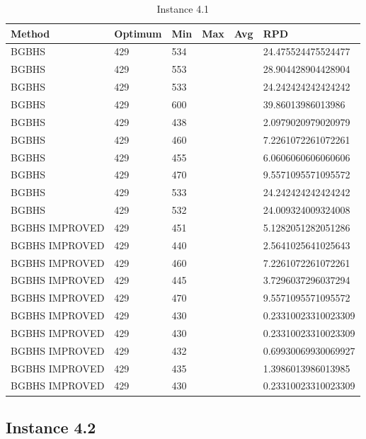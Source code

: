 \begin{table}[H]
\centering
\begin{tabular}{ | l | l | l | l | l | l | }
\hline
	Method & Optimum & Min & Max & Avg & RPD \\ \hline
	BGBHS & 429 & 534 &  &  & 24.475524475524477 \\ \hline
	BGBHS & 429 & 553 &  &  & 28.904428904428904 \\ \hline
	BGBHS & 429 & 533 &  &  & 24.242424242424242 \\ \hline
	BGBHS & 429 & 600 &  &  & 39.86013986013986 \\ \hline
	BGBHS & 429 & 438 &  &  & 2.0979020979020979 \\ \hline
	BGBHS & 429 & 460 &  &  & 7.2261072261072261 \\ \hline
	BGBHS & 429 & 455 &  &  & 6.0606060606060606 \\ \hline
	BGBHS & 429 & 470 &  &  & 9.5571095571095572 \\ \hline
	BGBHS & 429 & 533 &  &  & 24.242424242424242 \\ \hline
	BGBHS & 429 & 532 &  &  & 24.009324009324008 \\ \hline
	BGBHS IMPROVED & 429 & 451 &  &  & 5.1282051282051286 \\ \hline
	BGBHS IMPROVED & 429 & 440 &  &  & 2.5641025641025643 \\ \hline
	BGBHS IMPROVED & 429 & 460 &  &  & 7.2261072261072261 \\ \hline
	BGBHS IMPROVED & 429 & 445 &  &  & 3.7296037296037294 \\ \hline
	BGBHS IMPROVED & 429 & 470 &  &  & 9.5571095571095572 \\ \hline
	BGBHS IMPROVED & 429 & 430 &  &  & 0.23310023310023309 \\ \hline
	BGBHS IMPROVED & 429 & 430 &  &  & 0.23310023310023309 \\ \hline
	BGBHS IMPROVED & 429 & 432 &  &  & 0.69930069930069927 \\ \hline
	BGBHS IMPROVED & 429 & 435 &  &  & 1.3986013986013985 \\ \hline
	BGBHS IMPROVED & 429 & 430 &  &  & 0.23310023310023309 \\ \hline
\end{tabular}

\caption{Instance 4.1}
\label{tblscp41}
\end{table}



\newpage
\subsection{Instance 4.2}

